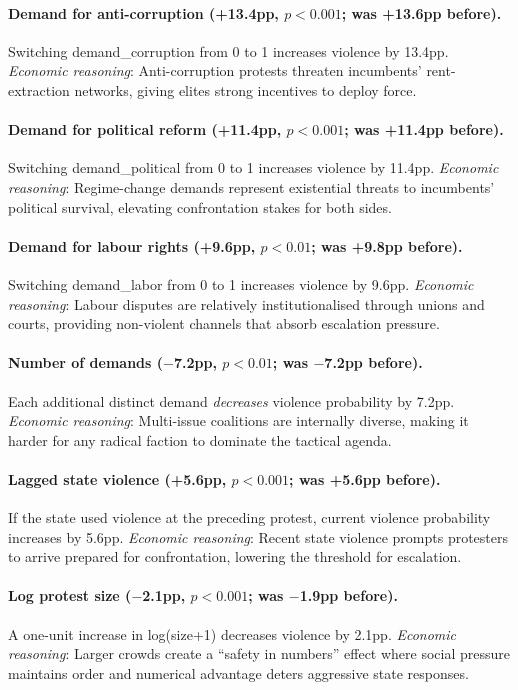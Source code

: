 \documentclass[12pt,a4paper]{article}
\begin{document}
\paragraph{Demand for anti-corruption (+13.4pp, $p < 0.001$; was +13.6pp before).}
Switching demand\_corruption from 0 to 1 increases violence by 13.4pp. \emph{Economic reasoning}: Anti-corruption protests threaten incumbents' rent-extraction networks, giving elites strong incentives to deploy force.

\paragraph{Demand for political reform (+11.4pp, $p < 0.001$; was +11.4pp before).}
Switching demand\_political from 0 to 1 increases violence by 11.4pp. \emph{Economic reasoning}: Regime-change demands represent existential threats to incumbents' political survival, elevating confrontation stakes for both sides.

\paragraph{Demand for labour rights (+9.6pp, $p < 0.01$; was +9.8pp before).}
Switching demand\_labor from 0 to 1 increases violence by 9.6pp. \emph{Economic reasoning}: Labour disputes are relatively institutionalised through unions and courts, providing non-violent channels that absorb escalation pressure.

\paragraph{Number of demands ($-$7.2pp, $p < 0.01$; was $-$7.2pp before).}
Each additional distinct demand \emph{decreases} violence probability by 7.2pp. \emph{Economic reasoning}: Multi-issue coalitions are internally diverse, making it harder for any radical faction to dominate the tactical agenda.

\paragraph{Lagged state violence (+5.6pp, $p < 0.001$; was +5.6pp before).}
If the state used violence at the preceding protest, current violence probability increases by 5.6pp. \emph{Economic reasoning}: Recent state violence prompts protesters to arrive prepared for confrontation, lowering the threshold for escalation.

\paragraph{Log protest size ($-$2.1pp, $p < 0.001$; was $-$1.9pp before).}
A one-unit increase in log(size+1) decreases violence by 2.1pp. \emph{Economic reasoning}: Larger crowds create a ``safety in numbers'' effect where social pressure maintains order and numerical advantage deters aggressive state responses.
\end{document}
